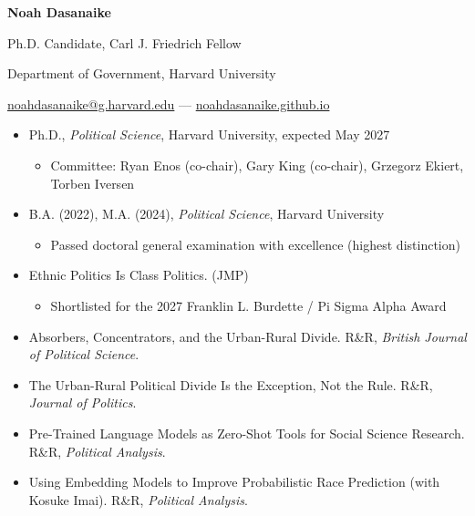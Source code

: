 \documentclass[12pt]{article}
\newcommand{\cvsection}[1]{\noindent{\bf {\normalsize #1}}\par\nopagebreak\vspace{1.2mm}}
\begin{document}
\begin{footnotesize}

\begin{center}
{\bf {\large Noah Dasanaike}}
\vspace{3mm}

Ph.D. Candidate, Carl J. Friedrich Fellow

Department of Government, Harvard University

\href{mailto:noahdasanaike@g.harvard.edu}{noahdasanaike@g.harvard.edu} — \href{https://noahdasanaike.github.io}{noahdasanaike.github.io}
\end{center}

\vspace{2.4mm}

\cvsection{Education}

\begin{itemize}
    \item Ph.D., \textit{Political Science}, Harvard University, expected May 2027
    \begin{itemize}
        \item Committee: Ryan Enos (co-chair), Gary King (co-chair), Grzegorz Ekiert, Torben Iversen
    \end{itemize}
    \item B.A. (2022), M.A. (2024), \textit{Political Science}, Harvard University
    \begin{itemize}
        \item Passed doctoral general examination with excellence (highest distinction)
    \end{itemize}
\end{itemize}

\vspace{2.4mm}

\cvsection{Working Papers}

\begin{itemize}
\item Ethnic Politics Is Class Politics. (JMP)
    \begin{itemize}
        \item Shortlisted for the 2027 Franklin L. Burdette / Pi Sigma Alpha Award
    \end{itemize}
\item Absorbers, Concentrators, and the Urban-Rural Divide. R\&R, \emph{British Journal of Political Science}.
\item The Urban-Rural Political Divide Is the Exception, Not the Rule. R\&R,
    \emph{Journal of Politics}.
    \item Pre-Trained Language Models as Zero-Shot Tools for Social Science Research. R\&R, \emph{Political Analysis}.
    \item Using Embedding Models to Improve Probabilistic Race Prediction (with Kosuke Imai). R\&R, \emph{Political Analysis}.
\end{itemize}


\end{footnotesize}
\end{document}
